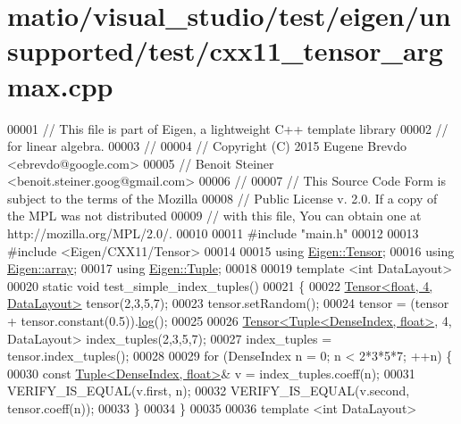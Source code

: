 \hypertarget{matio_2visual__studio_2test_2eigen_2unsupported_2test_2cxx11__tensor__argmax_8cpp_source}{}\section{matio/visual\+\_\+studio/test/eigen/unsupported/test/cxx11\+\_\+tensor\+\_\+argmax.cpp}
\label{matio_2visual__studio_2test_2eigen_2unsupported_2test_2cxx11__tensor__argmax_8cpp_source}

\begin{DoxyCode}
00001 \textcolor{comment}{// This file is part of Eigen, a lightweight C++ template library}
00002 \textcolor{comment}{// for linear algebra.}
00003 \textcolor{comment}{//}
00004 \textcolor{comment}{// Copyright (C) 2015 Eugene Brevdo <ebrevdo@google.com>}
00005 \textcolor{comment}{//                    Benoit Steiner <benoit.steiner.goog@gmail.com>}
00006 \textcolor{comment}{//}
00007 \textcolor{comment}{// This Source Code Form is subject to the terms of the Mozilla}
00008 \textcolor{comment}{// Public License v. 2.0. If a copy of the MPL was not distributed}
00009 \textcolor{comment}{// with this file, You can obtain one at http://mozilla.org/MPL/2.0/.}
00010 
00011 \textcolor{preprocessor}{#include "main.h"}
00012 
00013 \textcolor{preprocessor}{#include <Eigen/CXX11/Tensor>}
00014 
00015 \textcolor{keyword}{using} \hyperlink{class_eigen_1_1_tensor}{Eigen::Tensor};
00016 \textcolor{keyword}{using} \hyperlink{class_eigen_1_1array}{Eigen::array};
00017 \textcolor{keyword}{using} \hyperlink{struct_eigen_1_1_tuple}{Eigen::Tuple};
00018 
00019 \textcolor{keyword}{template} <\textcolor{keywordtype}{int} DataLayout>
00020 \textcolor{keyword}{static} \textcolor{keywordtype}{void} test\_simple\_index\_tuples()
00021 \{
00022   \hyperlink{class_eigen_1_1_tensor}{Tensor<float, 4, DataLayout>} tensor(2,3,5,7);
00023   tensor.setRandom();
00024   tensor = (tensor + tensor.constant(0.5)).\hyperlink{structlog}{log}();
00025 
00026   \hyperlink{class_eigen_1_1_tensor}{Tensor<Tuple<DenseIndex, float>}, 4, DataLayout> index\_tuples(2,3,5,7);
00027   index\_tuples = tensor.index\_tuples();
00028 
00029   \textcolor{keywordflow}{for} (DenseIndex n = 0; n < 2*3*5*7; ++n) \{
00030     \textcolor{keyword}{const} \hyperlink{struct_eigen_1_1_tuple}{Tuple<DenseIndex, float>}& v = index\_tuples.coeff(n);
00031     VERIFY\_IS\_EQUAL(v.first, n);
00032     VERIFY\_IS\_EQUAL(v.second, tensor.coeff(n));
00033   \}
00034 \}
00035 
00036 \textcolor{keyword}{template} <\textcolor{keywordtype}{int} DataLayout>

\end{DoxyCode}
